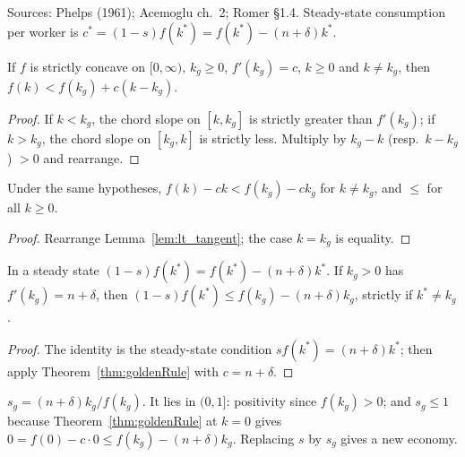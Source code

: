 Sources: Phelps (1961); Acemoglu ch.~2; Romer \S1.4. Steady-state consumption per worker is
$c^* = (1 - s) f(k^*) = f(k^*) - (n + \delta) k^*$.

\begin{lemma}
\label{lem:lt_tangent}
\leanok
If $f$ is strictly concave on $[0, \infty)$, $k_g \ge 0$, $f'(k_g) = c$, $k \ge 0$ and $k \neq k_g$, then
$f(k) < f(k_g) + c (k - k_g)$.
\end{lemma}
\begin{proof}
\leanok
If $k < k_g$, the chord slope on $[k, k_g]$ is strictly greater than $f'(k_g)$; if $k > k_g$, the chord slope on
$[k_g, k]$ is strictly less. Multiply by $k_g - k$ (resp.\ $k - k_g$) $> 0$ and rearrange.
\end{proof}

\begin{theorem}
\label{thm:goldenRule}
\leanok
{}
Under the same hypotheses, $f(k) - c k < f(k_g) - c k_g$ for $k \neq k_g$, and $\le$ for all $k \ge 0$.
\end{theorem}
\begin{proof}
\leanok
Rearrange Lemma~\ref{lem:lt_tangent}; the case $k = k_g$ is equality.
\end{proof}

\begin{theorem}
\label{thm:consumption_le_goldenRule}
\leanok
{}
In a steady state $(1 - s) f(k^*) = f(k^*) - (n + \delta) k^*$. If $k_g > 0$ has $f'(k_g) = n + \delta$, then
$(1 - s) f(k^*) \le f(k_g) - (n + \delta) k_g$, strictly if $k^* \neq k_g$.
\end{theorem}
\begin{proof}
\leanok
The identity is the steady-state condition $s f(k^*) = (n + \delta) k^*$; then apply Theorem~\ref{thm:goldenRule}
with $c = n + \delta$.
\end{proof}

\begin{definition}
\label{def:goldenSavingRate}
\leanok
{}
$s_g = (n + \delta) k_g / f(k_g)$. It lies in $(0, 1]$: positivity since $f(k_g) > 0$; and $s_g \le 1$ because
Theorem~\ref{thm:goldenRule} at $k = 0$ gives $0 = f(0) - c \cdot 0 \le f(k_g) - (n + \delta) k_g$. Replacing
$s$ by $s_g$ gives a new economy.
\end{definition}

